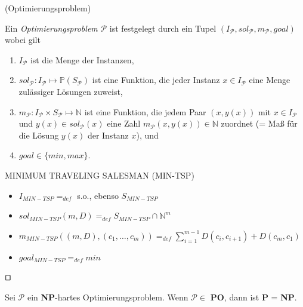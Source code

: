\begin{definition}(Optimierungsproblem)

Ein \emph{Optimierungsproblem} $\mathcal{P}$ ist festgelegt durch ein Tupel
$(I_\mathcal{P}, sol_\mathcal{P}, m_\mathcal{P}, goal)$ wobei gilt

\begin{enumerate}
\item $I_\mathcal{P}$ ist die Menge der Instanzen,
\item $sol_\mathcal{P} : I_\mathcal{P} \longmapsto \mathbb{P}(S_\mathcal{P})$ ist eine Funktion, die jeder Instanz $x \in I_\mathcal{P}$ eine Menge zulässiger Lösungen zuweist,
\item $m_\mathcal{P} : I_\mathcal{P} \times S_\mathcal{P} \longmapsto \mathbb{N}$ ist eine Funktion, die jedem Paar $(x,y(x))$ mit $x \in I_\mathcal{P}$ und $y(x) \in sol_\mathcal{P}(x)$ eine
Zahl $m_\mathcal{P}(x,y(x)) \in \mathbb{N}$ zuordnet (= Maß für die Lösung $y(x)$ der Instanz $x$), und
\item $goal \in \{min,max\}$.
\end{enumerate}

\end{definition}

\begin{example} MINIMUM TRAVELING SALESMAN (MIN-TSP)
\begin{itemize}
\item $I_{MIN-TSP} =_{def}$ s.o., ebenso $S_{MIN-TSP}$
\item $sol_{MIN-TSP}(m,D) =_{def} S_{MIN-TSP} \cap \mathbb{N}^m$ 
\item $m_{MIN-TSP}((m,D),(c_1, \ldots , c_m)) =_{def} \sum_{i=1}^{m-1} D(c_i, c_{i+1}) + D(c_m,c_1)$ 
\item $goal_{MIN-TSP} =_{def} min$
\end{itemize}
\begin{flushright}
$\qed$
\end{flushright}
\end{example}

\begin{theorem} Sei $\mathcal{P}$ ein \textbf{NP}-hartes Optimierungsproblem.
Wenn $\mathcal{P} \in$ \textbf{PO}, dann ist \textbf{P} = \textbf{NP}.
\end{theorem}

